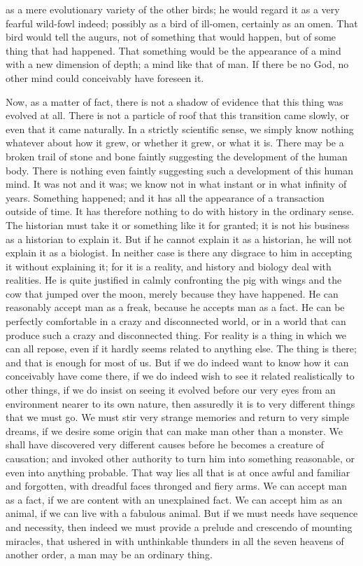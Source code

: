 as a mere evolutionary variety of the other birds; he would regard it as a very fearful wild-fowl indeed; possibly as a bird of ill-omen, certainly as an omen. That bird would tell the augurs, not of something that would happen, but of some thing that had happened. That something would be the appearance of a mind with a new dimension of depth; a mind like that of man. If there be no God, no other mind could conceivably have foreseen it.

Now, as a matter of fact, there is not a shadow of evidence that this thing was evolved at all. There is not a particle of roof that this transition came slowly, or even that it came naturally. In a strictly scientific sense, we simply know nothing whatever about how it grew, or whether it grew, or what it is. There may be a broken trail of stone and bone faintly suggesting the development of the human body. There is nothing even faintly suggesting such a development of this human mind. It was not and it was; we know not in what instant or in what infinity of years. Something happened; and it has all the appearance of a transaction outside of time. It has therefore nothing to do with history in the ordinary sense. The historian must take it or something like it for granted; it is not his business as a historian to explain it. But if he cannot explain it as a historian, he will not explain it as a biologist. In neither case is there any disgrace to him in accepting it without explaining it; for it is a reality, and history and biology deal with realities. He is quite justified in calmly confronting the pig with wings and the cow that jumped over the moon, merely because they have happened. He can reasonably accept man as a freak, because he accepts man as a fact. He can be perfectly comfortable in a crazy and disconnected world, or in a world that can produce such a crazy and disconnected thing. For reality is a thing in which we can all repose, even if it hardly seems related to anything else. The thing is there; and that is enough for most of us. But if we do indeed want to know how it can conceivably have come there, if we do indeed wish to see it related realistically to other things, if we do insist on seeing it evolved before our very eyes from an environment nearer to its own nature, then assuredly it is to very different things that we must go. We must stir very strange memories and return to very simple dreams, if we desire some origin that can make man other than a monster. We shall have discovered very different causes before he becomes a creature of causation; and invoked other authority to turn him into something reasonable, or even into anything probable. That way lies all that is at once awful and familiar and forgotten, with dreadful faces thronged and fiery arms. We can accept man as a fact, if we are content with an unexplained fact. We can accept him as an animal, if we can live with a fabulous animal. But if we must needs have sequence and necessity, then indeed we must provide a prelude and crescendo of mounting miracles, that ushered in with unthinkable thunders in all the seven heavens of another order, a man may be an ordinary thing.

